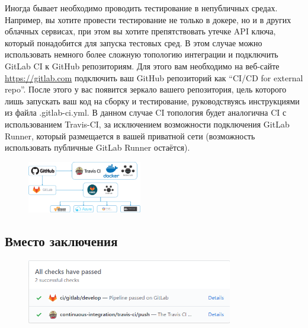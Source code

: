 \documentclass[10pt, a5paper]{article}
\begin{document}
Иногда бывает необходимо проводить тестирование в непубличных средах. Например, вы хотите провести тестирование не только в докере, но и в других облачных сервисах, при этом вы хотите препятствовать утечке API ключа, который понадобится для запуска тестовых сред. В этом случае можно использовать немного более сложную топологию интеграции и подключить GitLab CI к GitHub репозиториям.
Для этого вам необходимо на веб-сайте \url{https://gitlab.com} подключить ваш GitHub репозиторий как “CI/CD for external repo”. После этого у вас появится зеркало вашего репозитория, цель которого лишь запускать ваш код на сборку и тестирование, руководствуясь инструкциями из файла .gitlab-ci.yml. В данном случае CI топология будет аналогична CI с использованием Travis-CI, за исключением возможности подключения GitLab Runner, который размещается в вашей приватной сети (возможность использовать публичные GitLab Runner остаётся). 

\begin{center}
\begin{figure}[h!]
  \centering
  \includegraphics[width=5cm]{05_2018_Kharkevich3.png}
  \label{Kharkevich5}
\end{figure}
\end{center} 

\subsection*{Вместо заключения}

\begin{center}
\begin{figure}[h!]
  \centering
  \includegraphics[width=9cm]{05_2018_Kharkevich4.png}
  \label{Kharkevich6}
\end{figure}
\end{center} 
\end{document}

